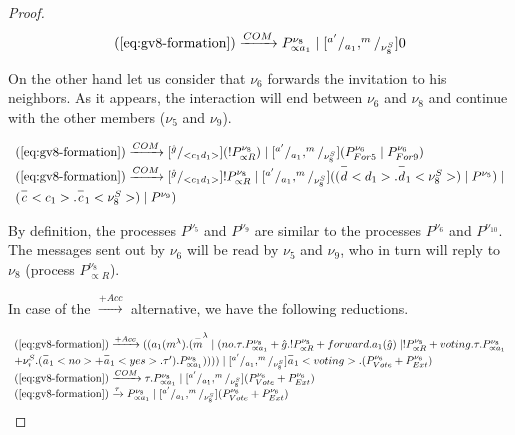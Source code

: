 \begin{proof}
\[
\begin{array}{l}
	(\ref{eq:gv8-formation})\xrightarrow{COM} P^{\nu_8}_{\propto a_1} \mid [^{a^\prime}/_{a_1}, ^m/_{\nu_8^S}] 0
\end{array}
\]

On the other hand let us consider that $\nu_6$ forwards the invitation to his neighbors. As it appears, the interaction will end between $\nu_6$ and $\nu_8$ and continue with the other members ($\nu_5$ and $\nu_9$).

\[
\begin{array}{l}
	(\ref{eq:gv8-formation})\xrightarrow{COM} [^{\hat{g}}/_{<c_1d_1>}](!P^{\nu_8}_{\propto R})\mid [^{a^\prime}/_{a_1}, ^m/_{\nu_8^S}] (P^{\nu_6}_{For5}\mid P^{\nu_6}_{For9})\\
	(\ref{eq:gv8-formation})\xrightarrow{COM} [^{\hat{g}}/_{<c_1d_1>}]!P^{\nu_8}_{\propto R}\mid [^{a^\prime}/_{a_1}, ^m/_{\nu_8^S}] ((\overset{-}{d}<d_1>.\overset{-}{d}_1<\nu_8^S>)\mid P^{\nu_5})\mid\\ (\overset{-}{c}<c_1>.\overset{-}{c}_1<\nu_8^S>)\mid P^{\nu_9})\\
\end{array}
\]

By definition, the processes $P^{\nu_5}$ and $P^{\nu_9}$ are similar to the processes $P^{\nu_6}$ and $P^{\nu_{10}}$. The
messages sent out by $\nu_6$ will be read by $\nu_5$ and $\nu_9$, who in turn will reply to $\nu_8$ (process $P^{\nu_8}_{\propto R}$).

In case of the $\xrightarrow{+Acc}$ alternative, we have the following reductions.

\[
\begin{array}{l}
	(\ref{eq:gv8-formation})\xrightarrow{+Acc} ((a_1(m^\lambda).(\overset{-}{m}^\lambda\mid (no.\tau.P^{\nu_8}_{\propto a_1} + \hat{g}.!P^{\nu_8}_{\propto R} + forward.a_1(\hat{g})\mid !P^{\nu_8}_{\propto R} + voting.\tau.P^{\nu_8}_{\propto a_1}\\ + \nu_\imath^S.(\overset{-}{a}_1<no> + \overset{-}{a}_1<yes>.\tau^\prime).P^{\nu_8}_{\propto a_1})))) \mid [^{a^\prime}/_{a_1}, ^m/_{\nu_8^S}] \overset{-}{a}_1<voting>.(P^{\nu_6}_{Vote} + P^{\nu_6}_{Ext})\\
	(\ref{eq:gv8-formation})\xrightarrow{COM} \tau.P^{\nu_8}_{\propto a_1} \mid [^{a^\prime}/_{a_1}, ^m/_{\nu_8^S}] (P^{\nu_6}_{Vote} + P^{\nu_6}_{Ext})\\	
	(\ref{eq:gv8-formation})\xrightarrow{\tau} P^{\nu_8}_{\propto a_1} \mid [^{a^\prime}/_{a_1}, ^m/_{\nu_8^S}] (P^{\nu_6}_{Vote} + P^{\nu_6}_{Ext})\\	
\end{array}
\]


\end{proof}

